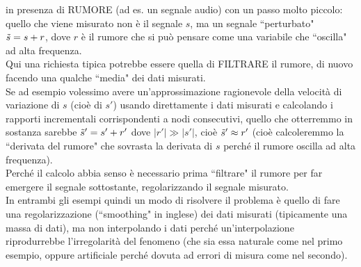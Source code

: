 in presenza di RUMORE (ad es. un segnale audio) con un passo molto piccolo: quello che viene misurato non è il segnale $s$, ma un segnale ``perturbato" $\Tilde{s} = s+r$, dove $r$ è il rumore che si può pensare come una variabile che ``oscilla" ad alta frequenza.\\
Qui una richiesta tipica potrebbe essere quella di FILTRARE il rumore, di nuovo facendo una qualche ``media" dei dati misurati.\\
Se ad esempio volessimo avere un'approssimazione ragionevole della velocità di variazione di $s$ (cioè
di $s'$) usando direttamente i dati misurati e calcolando i rapporti incrementali corrispondenti a nodi consecutivi, quello che otterremmo in sostanza sarebbe $\Tilde{s}' = s' + r'$ dove $|r'| \gg |s'|$, cioè $\Tilde{s}' \approx r'$ (cioè calcoleremmo la ``derivata del rumore" che sovrasta la derivata di $s$ perché il rumore oscilla ad alta frequenza). \\
Perché il calcolo abbia senso è necessario prima ``filtrare" il rumore per far emergere il segnale sottostante, regolarizzando il segnale misurato. \\
In entrambi gli esempi quindi
un modo di risolvere il problema è quello di fare una regolarizzazione (``smoothing" in inglese) dei dati misurati (tipicamente una massa di dati), ma non interpolando i dati perché un'interpolazione riprodurrebbe l'irregolarità del fenomeno (che sia essa naturale come nel primo esempio, oppure artificiale perché dovuta ad errori di misura come nel secondo). 

